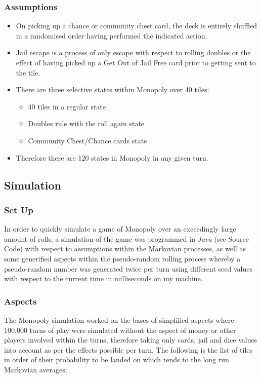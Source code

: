 \documentclass[12pt]{article}
\begin{document}
\subsubsection{Assumptions}
\begin{itemize}
\item On picking up a chance or community chest card, the deck is entirely shuffled in a randomised order having performed the indicated action.
\item Jail escape is a process of only escape with respect to rolling doubles or the effect of having picked up a Get Out of Jail Free card prior to getting sent to the tile.
\item There are three selective states within Monopoly over 40 tiles:
\begin{itemize}
\item 40 tiles in a regular state
\item Doubles rule with the roll again state
\item Community Chest/Chance cards state
\end{itemize}
\item Therefore there are 120 states in Monopoly in any given turn.
\end{itemize}

\subsection{Simulation}
\subsubsection{Set Up}
In order to quickly simulate a game of Monopoly over an exceedingly large amount of rolls, a simulation of the game was programmed in \emph{Java} (see Source Code) with respect to assumptions within the Markovian processes, as well as some generified aspects within the pseudo-random rolling process whereby a pseudo-random number was generated twice per turn using different seed values with respect to the current time in milliseconds on my machine. 

\subsubsection{Aspects}
The Monopoly simulation worked on the bases of simplified aspects where 100,000 turns of play were simulated without the aspect of money or other players involved within the turns, therefore taking only cards, jail and dice values into account as per the effects possible per turn. The following is the list of tiles in order of their probability to be landed on which tends to the long run Markovian averages:
\end{document}
